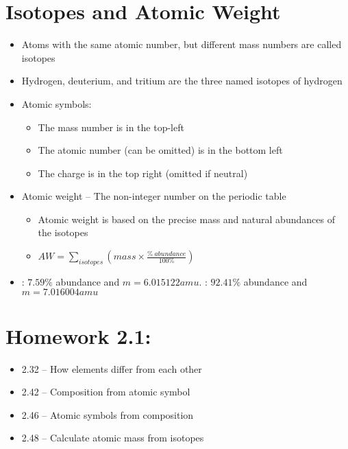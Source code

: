 \documentclass[12pt, openany, letterpaper]{memoir}
\begin{document}
\section{Isotopes and Atomic Weight}
\begin{itemize}
	\item Atoms with the same atomic number, but different mass numbers are called isotopes
	\item Hydrogen, deuterium, and tritium are the three named isotopes of hydrogen
	\item Atomic symbols: 
	      \begin{itemize}
		      \item The mass number is in the top-left
		      \item The atomic number (can be omitted) is in the bottom left
		      \item The charge is in the top right (omitted if neutral)
	      \end{itemize}
	\item Atomic weight -- The non-integer number on the periodic table
	      \begin{itemize}
		      \item Atomic weight is based on the precise mass and natural abundances of the isotopes
		      \item $AW=\sum\limits_{isotopes}\left(mass\times \frac{\%~abundance}{100\%}\right)$
	      \end{itemize}
	\item {}: $7.59\%$ abundance and $m=6.015122amu$. : $92.41\%$ abundance and $m=7.016004amu$
\end{itemize}

\section*{Homework 2.1:}
\begin{itemize}
	\item 2.32 -- How elements differ from each other
	\item 2.42 -- Composition from atomic symbol
	\item 2.46 -- Atomic symbols from composition
	\item 2.48 -- Calculate atomic mass from isotopes
\end{itemize}
\end{document}
